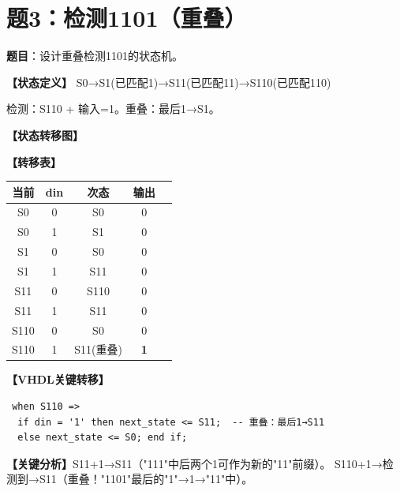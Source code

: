 \section{题3：检测1101（重叠）}

\textbf{题目}：设计重叠检测1101的状态机。

\begin{solution}[完整解答]

\textbf{【状态定义】}
S0→S1(已匹配1)→S11(已匹配11)→S110(已匹配110)

检测：S110 + 输入=1。重叠：最后1→S1。

\textbf{【状态转移图】}
\begin{center}
\end{center}

\textbf{【转移表】}
\begin{center}
\begin{tabular}{|c|c|c||c|c|}\hline
当前 & din & 次态 & 输出 \\ \hline
S0 & 0 & S0 & 0 \\ \hline S0 & 1 & S1 & 0 \\ \hline
S1 & 0 & S0 & 0 \\ \hline S1 & 1 & S11 & 0 \\ \hline
S11 & 0 & S110 & 0 \\ \hline S11 & 1 & S11 & 0 \\ \hline
S110 & 0 & S0 & 0 \\ \hline S110 & 1 & S11(重叠) & \textbf{1} \\ \hline
\end{tabular}
\end{center}

\textbf{【VHDL关键转移】}
\begin{lstlisting}
 when S110 =>
  if din = '1' then next_state <= S11;  -- 重叠：最后1→S11
  else next_state <= S0; end if;
\end{lstlisting}

\textbf{【关键分析】}S11+1→S11（"111"中后两个1可作为新的"11"前缀）。
S110+1→检测到→S11（重叠！"1101"最后的"1"→1→"11"中）。

\end{solution}


